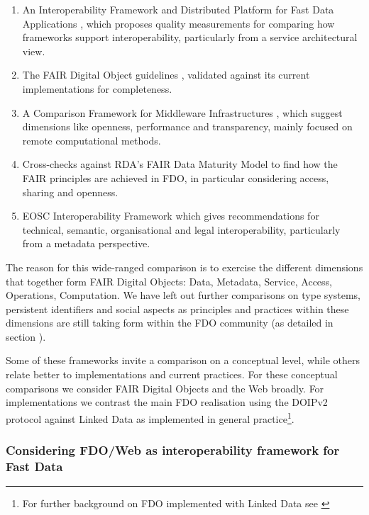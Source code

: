\begin{enumerate}
\tightlist
\item
  An Interoperability Framework and Distributed Platform for Fast Data Applications \cite{delgadoInteroperabilityFrameworkDistributed2016a}, which proposes quality measurements for comparing how frameworks support interoperability, particularly from a service architectural view.
\item
  The FAIR Digital Object guidelines \cite{bonino2019}, validated against its current implementations for completeness.
\item
  A Comparison Framework for Middleware Infrastructures \cite{zarrasComparisonFrameworkMiddleware2004a}, which suggest dimensions like openness, performance and transparency, mainly focused on remote computational methods.
\item
  Cross-checks against RDA's FAIR Data Maturity Model \cite{bahimFAIRDataMaturity2020a} to find how the FAIR principles are achieved in FDO, in particular considering access, sharing and openness.
\item
  EOSC Interoperability Framework \cite{eosc-interop-framework} which gives recommendations for technical, semantic, organisational and legal interoperability, particularly from a metadata perspective.
\end{enumerate}

The reason for this wide-ranged comparison is to exercise the different dimensions that together form FAIR Digital Objects: Data, Metadata, Service, Access, Operations, Computation.
We have left out further comparisons on type systems, persistent identifiers and social aspects as principles and practices within these dimensions are still taking form within the FDO community (as detailed in section ).

Some of these frameworks invite a comparison on a conceptual level, while others relate better to implementations and current practices. For these conceptual comparisons we consider FAIR Digital Objects and the Web broadly. For implementations we contrast the main FDO realisation using the DOIPv2 protocol \cite{DONA 2018} against Linked Data as implemented in general practice\footnote{For further background on FDO implemented with Linked Data see \cite{bonino2021,10.3897/rio.8.e94501}}.


\subsubsection{Considering FDO/Web as interoperability framework for Fast Data}\label{ch3:interoperability-compare}


